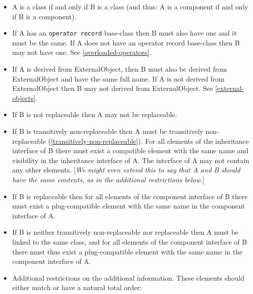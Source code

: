 \begin{itemize}
\item
  A is a class if and only if B is a class (and thus: A is a component
  if and only if B is a component).
\item
  If A has an \lstinline[basicstyle=\ttfamily]!operator record! base-class then B must also have one and
  it must be the same. If A does not have an operator record base-class
  then B may not have one. See \autoref{overloaded-operators}.
\item
  If A is derived from ExternalObject, then B must also be derived from
  ExternalObject and have the same full name. If A is not derived from
  ExternalObject then B may not derived from ExternalObject. See
  \autoref{external-objects}.
\item
  If B is not replaceable then A may not be replaceable.
\item
  If B is transitively non-replaceable then A must be transitively
  non-replaceable (\autoref{transitively-non-replaceable}). For all elements of the inheritance
  interface of B there must exist a compatible element with the same
  name and visibility in the inheritance interface of A. The interface
  of A may not contain any other elements. {[}\emph{We might even extend
  this to say that A and B should have the same contents, as in the
  additional restrictions below.}{]}
\item
  If B is replaceable then for all elements of the component interface
  of B there must exist a plug-compatible element with the same name in
  the component interface of A.
\item
  If B is neither transitively non-replaceable nor replaceable then A
  must be linked to the same class, and for all elements of the
  component interface of B there must thus exist a plug-compatible
  element with the same name in the component interface of A.
\item
  Additional restrictions on the additional information. These elements
  should either match or have a natural total order:


\end{itemize}
